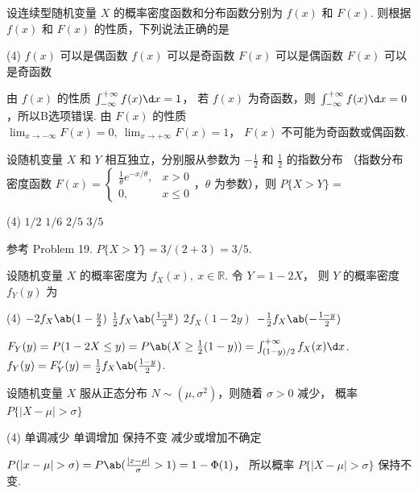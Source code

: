 \begin{problem}
  设连续型随机变量 $X$ 的概率密度函数和分布函数分别为 $f(x)$ 和 $F(x)$.
  则根据 $f(x)$ 和 $F(x)$ 的性质，下列说法正确的是
  \begin{tasks}(4)
    \task[\true] $f(x)$ 可以是偶函数
    \task $f(x)$ 可以是奇函数
    \task $F(x)$ 可以是偶函数
    \task $F(x)$ 可以是奇函数
  \end{tasks}
\end{problem}
\begin{solution}
  由 $f(x)$ 的性质 $\int_{-\infty}^{+\infty} f(x) \d x = 1$，
  若 $f(x)$ 为奇函数，则 $\int_{-\infty}^{+\infty} f(x) \d x = 0$，所以B选项错误.
  由 $F(x)$ 的性质
  $\lim_{x \to -\infty} F(x) = 0,~ \lim_{x \to +\infty} F(x) = 1$，
  $F(x)$ 不可能为奇函数或偶函数.
\end{solution}

\begin{problem}
  设随机变量 $X$ 和 $Y$ 相互独立，分别服从参数为 $-\frac12$ 和 $\frac12$ 的指数分布
  （指数分布密度函数 $F(x) =
  \begin{cases}
    \frac1\theta e^{-x/\theta}, & x > 0\\
    0,                          & x \leq 0
  \end{cases}$，$\theta$ 为参数），则 $P\{X > Y\} = $
  \begin{tasks}(4)
    \task $1/2$
    \task $1/6$
    \task $2/5$
    \task[\true] $3/5$
  \end{tasks}
\end{problem}
\begin{solution}
  参考 Problem 19. $P\{X > Y\} = 3/(2 + 3) = 3/5$.
\end{solution}

\begin{problem}
  设随机变量 $X$ 的概率密度为 $f_X(x),~ x \in \mathbb R$. 令 $Y = 1 - 2X$，
  则 $Y$ 的概率密度 $f_Y(y)$ 为
  \begin{tasks}(4)
    \task $-2f_X\ab(1 - \frac y2)$
    \task[\true] $\frac12 f_X\ab(\frac{1-y}{2})$
    \task $2f_X(1 - 2y)$
    \task $-\frac12 f_X\ab(-\frac{1 - y}{2})$
  \end{tasks}
\end{problem}
\begin{solution}
  $  F_Y(y) = P(1 - 2X \leq y) = P\ab(X \geq \frac12(1 - y))
   = \int_{(1 - y)/2}^{+\infty} f_X(x) \d x$.
  $f_Y(y) = F_Y'(y) = \frac12 f_X\ab(\frac{1 - y}{2})$.
\end{solution}

\begin{problem}
  设随机变量 $X$ 服从正态分布 $N \sim (\mu, \sigma^2)$，则随着 $\sigma > 0$ 减少，
  概率 $P\{|X - \mu| > \sigma\}$
  \begin{tasks}(4)
    \task 单调减少
    \task 单调增加
    \task[\true] 保持不变
    \task 减少或增加不确定
  \end{tasks}
\end{problem}
\begin{solution}
  $P(|x - \mu| > \sigma) = P\ab(\frac{|x - \mu|}{\sigma} > 1) = 1 - \Phi(1)$，
  所以概率 $P\{|X - \mu| > \sigma\}$ 保持不变.
\end{solution}

